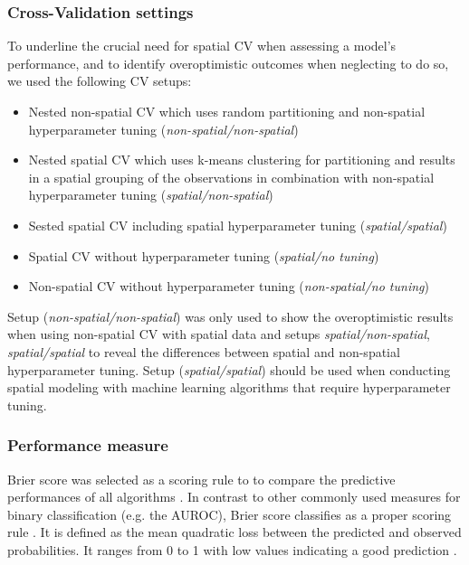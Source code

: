 \documentclass[review]{elsarticle}
\begin{document}
\subsubsection{Cross-Validation settings}

To underline the crucial need for spatial \ac{CV} when assessing a model's performance, and to identify overoptimistic outcomes when neglecting to do so, we used the following CV setups:

\begin{itemize}
	\item Nested non-spatial \ac{CV} which uses random partitioning and non-spatial hyperparameter tuning (\emph{non-spatial/non-spatial})
	\item Nested spatial \ac{CV} which uses k-means clustering for partitioning \citep{Brenning2005} and results in a spatial grouping of the observations in combination with non-spatial hyperparameter tuning (\emph{spatial/non-spatial})
	\item Sested spatial \ac{CV} including spatial hyperparameter tuning (\emph{spatial/spatial}) 
	\item Spatial \ac{CV} without hyperparameter tuning (\emph{spatial/no tuning})
	\item Non-spatial \ac{CV} without hyperparameter tuning (\emph{non-spatial/no tuning})
\end{itemize}

\noindent Setup (\emph{non-spatial/non-spatial}) was only used to show the overoptimistic results when using non-spatial \ac{CV} with spatial data and setups \emph{spatial/non-spatial}, \emph{spatial/spatial} to reveal the differences between spatial and non-spatial hyperparameter tuning.
Setup (\emph{spatial/spatial}) should be used when conducting spatial modeling with machine learning algorithms that require hyperparameter tuning.

\subsubsection{Performance measure}
Brier score was selected as a scoring rule to to compare the predictive performances of all algorithms \citep{Brier1950}.
In contrast to other commonly used measures for binary classification (e.g. the \ac{AUROC}), Brier score classifies as a proper scoring rule \citep{Byrne2016, Gneiting2007}.
It is defined as the mean quadratic loss between the predicted and observed probabilities.
It ranges from 0 to 1 with low values indicating a good prediction \citep{Brier1950}.
\end{document}
